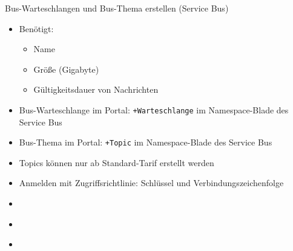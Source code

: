 \begin{flashcard}[Definition]{Bus-Warteschlangen und Bus-Thema erstellen (Service Bus)}
    \begin{itemize}
        \item Benötigt:
            \begin{itemize}
                \item Name
                \item Größe (Gigabyte)
                \item Gültigkeitsdauer von Nachrichten
            \end{itemize}
        \item Bus-Warteschlange im Portal:\newline
            \texttt{+Warteschlange} im Namespace-Blade des Service Bus
        \item Bus-Thema im Portal:\newline
            \texttt{+Topic} im Namespace-Blade des Service Bus
        \item Topics können nur ab Standard-Tarif erstellt werden
        \item Anmelden mit Zugriffsrichtlinie: Schlüssel und Verbindungszeichenfolge
    \end{itemize}
\end{flashcard}

\begin{flashcard}[Definition]{}
    \begin{itemize}
        \item
    \end{itemize}
\end{flashcard}

\begin{flashcard}[Definition]{}
    \begin{itemize}
        \item
    \end{itemize}
\end{flashcard}

\begin{flashcard}[Definition]{}
    \begin{itemize}
        \item
    \end{itemize}
\end{flashcard}
